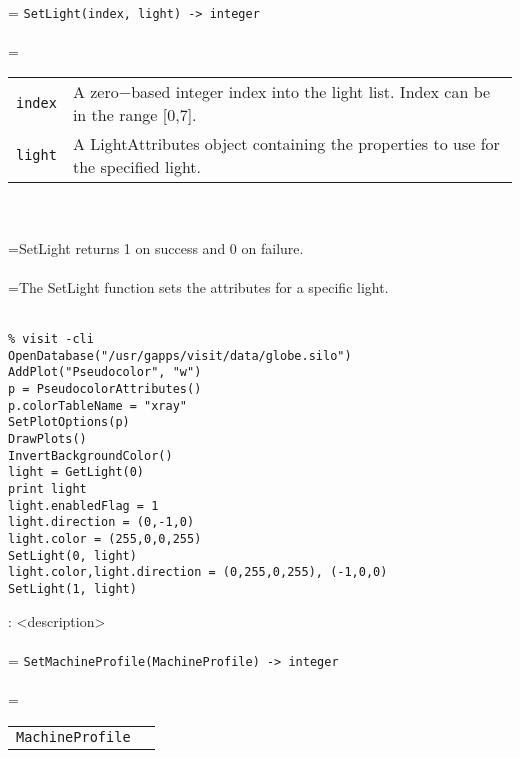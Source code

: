 \documentclass[10pt,a4paper]{report}
\begin{document}
 \\ 
\hangindent=\parindent 
\verb!SetLight(index, light) -> integer!\\ [-3mm]

 \\ 
\hangindent=\parindent 
\begin{tabular}{lp{9cm}}
\verb!index! & A zero$-$based integer index into the light list. Index can be in the range [0,7]. \\
\verb!light! & A LightAttributes object containing the properties to use for the specified light. \\
\end{tabular} \\[-2mm]


 \\ 
\hangindent=\parindent SetLight returns 1 on success and 0 on failure. \\[-3mm] 

 \\ 
\hangindent=\parindent The SetLight function sets the attributes for a specific light.  \\[-3mm] 

\\[-6mm]
\begin{verbatim}% visit -cli
OpenDatabase("/usr/gapps/visit/data/globe.silo")
AddPlot("Pseudocolor", "w")
p = PseudocolorAttributes()
p.colorTableName = "xray"
SetPlotOptions(p)
DrawPlots()
InvertBackgroundColor()
light = GetLight(0)
print light
light.enabledFlag = 1
light.direction = (0,-1,0)
light.color = (255,0,0,255)
SetLight(0, light)
light.color,light.direction = (0,255,0,255), (-1,0,0)
SetLight(1, light)
\end{verbatim}
\newpage


{}
: <description>\\[-3mm]

 \\ 
\hangindent=\parindent 
\verb!SetMachineProfile(MachineProfile) -> integer!\\ [-3mm]

 \\ 
\hangindent=\parindent 
\begin{tabular}{ll}
\verb!MachineProfile! &  \\
\end{tabular} \\[-2mm]
\end{document}
